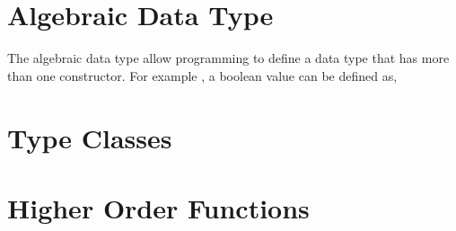 \section{Algebraic Data Type}
The algebraic data type allow programming to define a data type that has
more than one constructor. For example , a boolean value can be defined as,


\section{Type Classes}


\section{Higher Order Functions}